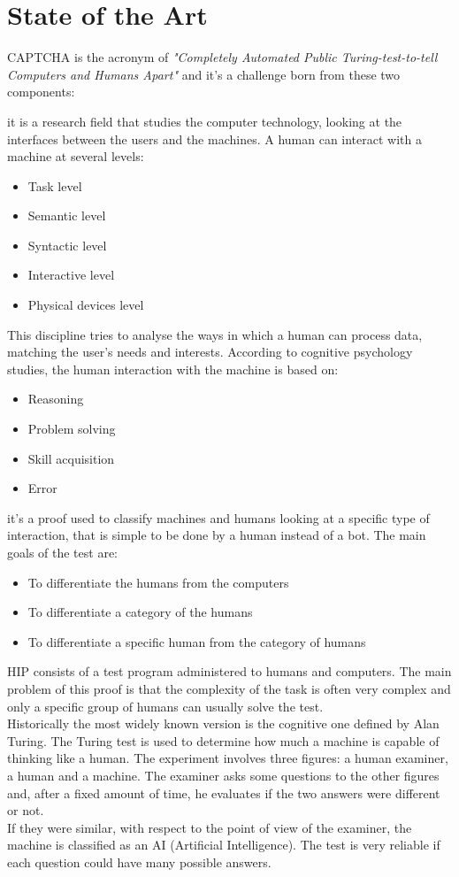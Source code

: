 \chapter{State of the Art}\label{chapter:StateOfArt}
CAPTCHA is the acronym of \textit{"Completely Automated Public Turing-test-to-tell Computers and Humans Apart"} and it's a challenge born from these two components\cite{types_CAPTCHA}:
\begin{enumerate}
{it is a research field that studies the computer technology, looking at the interfaces between the users and the machines. A human can interact with a machine at several levels:
\begin{itemize}
	\item{Task level}
	\item{Semantic level}
	\item{Syntactic level}
	\item{Interactive level}
	\item{Physical devices level}
\end{itemize}
This discipline tries to analyse the ways in which a human can process data, matching the user's needs and interests. According to cognitive psychology studies, the human interaction with the machine is based on:
\begin{itemize}
	\item{Reasoning}
	\item{Problem solving}
	\item{Skill acquisition}
	\item{Error}
\end{itemize}   
}
{it's a proof used to classify machines and humans looking at a specific type of interaction, that is simple to be done by a human instead of a bot. The main goals of the test are:
\begin{itemize}
	\item{To differentiate the humans from the computers}
	\item{To differentiate a category of the humans}
	\item{To differentiate a specific human from the category of humans}
\end{itemize}
HIP consists of a test program administered to humans and computers. The main problem of this proof is that the complexity of the task is often very complex and only a specific group of humans can usually solve the test.\\
Historically the most widely known version is the cognitive one defined by Alan Turing. The Turing test is used to determine how much a machine is capable of thinking like a human. The experiment involves three figures: a human examiner, a human and a machine. The examiner asks some questions to the other figures and, after a fixed amount of time, he evaluates if the two answers were different or not.\\
If they were similar, with respect to the point of view of the examiner, the machine is classified as an AI (Artificial Intelligence). The test is very reliable if each question could have many possible answers.}
\end{enumerate}
